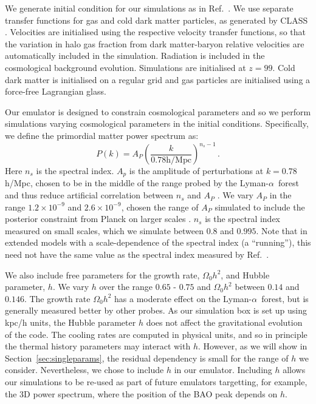 \documentclass[a4paper,11pt]{article}
\newcommand{\Lya}{Lyman-$\alpha$}
\begin{document}
We generate initial condition for our simulations as in Ref.~\cite{Bird:2020}. We use separate transfer functions for gas and cold dark matter particles, as generated by CLASS \cite{CLASS}. Velocities are initialised using the respective velocity transfer functions, so that the variation in halo gas fraction from dark matter-baryon relative velocities are automatically included in the simulation. Radiation is included in the cosmological background evolution. Simulations are initialised at $z=99$. Cold dark matter is initialised on a regular grid and gas particles are initialised using a force-free Lagrangian glass.

Our emulator is designed to constrain cosmological parameters and so we perform simulations varying cosmological parameters in the initial conditions. Specifically, we define the primordial matter power spectrum as:
\begin{equation}
 P(k) = A_P \left(\frac{k}{ 0.78 \mathrm{h/Mpc}}\right)^{n_s-1}\,.
 \label{eq:pk}
\end{equation}
Here $n_s$ is the spectral index. $A_p$ is the amplitude of perturbations at $k = 0.78$ h/Mpc, chosen to be in the middle of the range probed by the \Lya~forest and thus reduce artificial correlation between $n_s$ and $A_P$ \cite{Bird:2019}. We vary $A_P$ in the range $1.2 \times 10^{-9}$ and $2.6 \times 10^{-9}$, chosen the range of $A_P$ simulated to include the posterior constraint from Planck on larger scales \cite{Planck:2018}.
$n_s$ is the spectral index measured on small scales, which we simulate between $0.8$ and $0.995$. Note that in extended models with a scale-dependence of the spectral index (a ``running''), this need not have the same value as the spectral index measured by Ref.~\cite{Planck:2018}.

We also include free parameters for the growth rate, $\Omega_0 h^2$, and Hubble parameter, $h$. We vary $h$ over the range $0.65$ - $0.75$ and $\Omega_0 h^2$ between $0.14$ and $0.146$. The growth rate $\Omega_0 h^2$ has a moderate effect on the \Lya~forest, but is generally measured better by other probes. As our simulation box is set up using kpc/h units, the Hubble parameter $h$ does not affect the gravitational evolution of the code. The cooling rates are computed in physical units, and so in principle the thermal history parameters may interact with $h$. However, as we will show in Section~\ref{sec:singleparams}, the residual dependency is small for the range of $h$ we consider. Nevertheless, we chose to include $h$ in our emulator. Including $h$ allows our simulations to be re-used as part of future emulators targetting, for example, the 3D power spectrum, where the position of the BAO peak depends on $h$.
\end{document}
